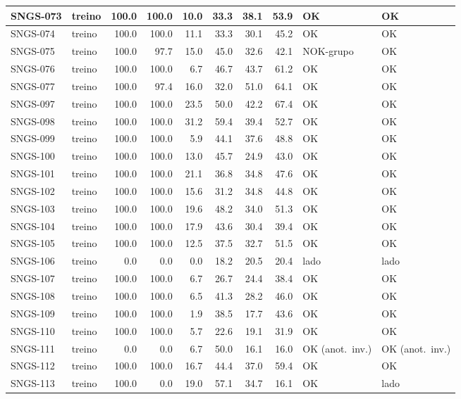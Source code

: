 \begin{small}
\begin{longtable}{|l|l|r|r|r|r|r|r|l|l|}
SNGS-073 & treino & 100.0 & 100.0 & 10.0 & 33.3 & 38.1 & 53.9 & OK & OK \\ \hline
SNGS-074 & treino & 100.0 & 100.0 & 11.1 & 33.3 & 30.1 & 45.2 & OK & OK \\ \hline
SNGS-075 & treino & 100.0 & 97.7 & 15.0 & 45.0 & 32.6 & 42.1 & NOK-grupo & OK \\ \hline
SNGS-076 & treino & 100.0 & 100.0 & 6.7 & 46.7 & 43.7 & 61.2 & OK & OK \\ \hline
SNGS-077 & treino & 100.0 & 97.4 & 16.0 & 32.0 & 51.0 & 64.1 & OK & OK \\ \hline
SNGS-097 & treino & 100.0 & 100.0 & 23.5 & 50.0 & 42.2 & 67.4 & OK & OK \\ \hline
SNGS-098 & treino & 100.0 & 100.0 & 31.2 & 59.4 & 39.4 & 52.7 & OK & OK \\ \hline
SNGS-099 & treino & 100.0 & 100.0 & 5.9 & 44.1 & 37.6 & 48.8 & OK & OK \\ \hline
SNGS-100 & treino & 100.0 & 100.0 & 13.0 & 45.7 & 24.9 & 43.0 & OK & OK \\ \hline
SNGS-101 & treino & 100.0 & 100.0 & 21.1 & 36.8 & 34.8 & 47.6 & OK & OK \\ \hline
SNGS-102 & treino & 100.0 & 100.0 & 15.6 & 31.2 & 34.8 & 44.8 & OK & OK \\ \hline
SNGS-103 & treino & 100.0 & 100.0 & 19.6 & 48.2 & 34.0 & 51.3 & OK & OK \\ \hline
SNGS-104 & treino & 100.0 & 100.0 & 17.9 & 43.6 & 30.4 & 39.4 & OK & OK \\ \hline
SNGS-105 & treino & 100.0 & 100.0 & 12.5 & 37.5 & 32.7 & 51.5 & OK & OK \\ \hline
SNGS-106 & treino & 0.0 & 0.0 & 0.0 & 18.2 & 20.5 & 20.4 & lado & lado \\ \hline
SNGS-107 & treino & 100.0 & 100.0 & 6.7 & 26.7 & 24.4 & 38.4 & OK & OK \\ \hline
SNGS-108 & treino & 100.0 & 100.0 & 6.5 & 41.3 & 28.2 & 46.0 & OK & OK \\ \hline
SNGS-109 & treino & 100.0 & 100.0 & 1.9 & 38.5 & 17.7 & 43.6 & OK & OK \\ \hline
SNGS-110 & treino & 100.0 & 100.0 & 5.7 & 22.6 & 19.1 & 31.9 & OK & OK \\ \hline
SNGS-111 & treino & 0.0 & 0.0 & 6.7 & 50.0 & 16.1 & 16.0 & OK (anot.\ inv.) & OK (anot.\ inv.) \\ \hline
SNGS-112 & treino & 100.0 & 100.0 & 16.7 & 44.4 & 37.0 & 59.4 & OK & OK \\ \hline
SNGS-113 & treino & 100.0 & 0.0 & 19.0 & 57.1 & 34.7 & 16.1 & OK & lado \\ \hline

\end{longtable}
\end{small}
